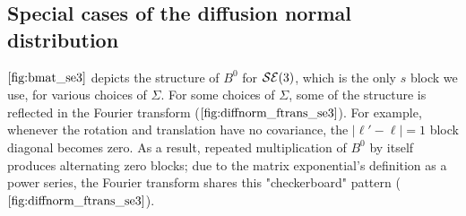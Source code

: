 \documentclass[../../main.tex]{subfiles}
\begin{document}
\begin{refsection}
	\section{Special cases of the diffusion normal distribution}

	$\cref{fig:bmat_se3}$ depicts the structure of $B^0$ for $\mathcal{SE} (3)$, which is the only $s$ block we use, for various choices of $\Sigma$.
	For some choices of $\Sigma$, some of the structure is reflected in the Fourier transform ($\cref{fig:diffnorm_ftrans_se3}$).
	For example, whenever the rotation and translation have no covariance, the $|\ell' - \ell| = 1$ block diagonal becomes zero.
	As a result, repeated multiplication of $B^0$ by itself produces alternating zero blocks; due to the matrix exponential's definition as a power series, the Fourier transform shares this "checkerboard" pattern ($\cref{fig:diffnorm_ftrans_se3}$).


\end{refsection}
\end{document}
